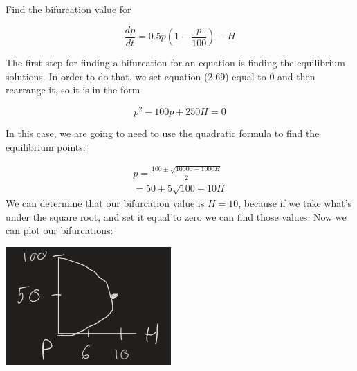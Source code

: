   \begin{problem}
    Find the bifurcation value for 

    \[
      \frac{dp}{dt}=0.5p\left(1-\frac{p}{100}\right)-H
    \]

    The first step for finding a bifurcation for an equation is finding the equilibrium solutions. In order to do that, we set equation (2.69) equal to 0 and then rearrange it, so it is in the form

    \[
      p^2-100p+250H=0
    \]

    In this case, we are going to need to use the quadratic formula to find the equilibrium points:

    \begin{align*}
      p=\frac{100\pm\sqrt{10000-1000H}}{2}\\
      =50\pm5\sqrt{100-10H}
    \end{align*}
    We can determine that our bifurcation value is $H=10$, because if we take what's under the square root, and set it equal to zero we can find those values.
    Now we can plot our bifurcations:
    \begin{center}
      \includegraphics{resource/images/2.7 Example 3 1.jpg}
    \end{center}
  \end{problem}
